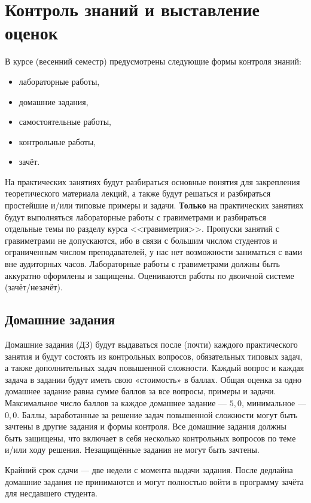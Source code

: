 \documentclass[11pt, a4paper]{article}
\theoremstyle{plain}
\theoremstyle{definition}
\theoremstyle{remark}
\begin{document}
\section{Контроль знаний и выставление оценок}
В курсе (весенний семестр) предусмотрены следующие формы контроля знаний: 
\begin{itemize}
    \item лабораторные работы,
    \item домашние задания,
    \item самостоятельные работы,
    \item контрольные работы,
    \item зачёт.
\end{itemize}

На практических занятиях будут разбираться основные понятия для закрепления теоретического материала
лекций, а также будут решаться и разбираться простейшие и/или типовые примеры и задачи.
\textbf{Только} на
практических занятиях будут выполняться лабораторные работы с гравиметрами и разбираться отдельные
темы по разделу курса <<гравиметрия>>. Пропуски занятий с гравиметрами не допускаются, ибо в связи с
большим числом студентов и ограниченным числом преподавателей, у нас нет возможности заниматься с
вами вне аудиторных часов. Лабораторные работы с гравиметрами должны быть аккуратно оформлены и
защищены. Оцениваются работы по двоичной системе (зачёт/незачёт).

\subsection{Домашние задания}
Домашние задания (ДЗ) будут выдаваться после (почти) каждого практического занятия и будут
состоять из контрольных вопросов, обязательных типовых задач, а также дополнительных задач
повышенной сложности. Каждый вопрос и каждая задача в задании будут иметь свою «стоимость» в баллах.
Общая оценка за одно домашнее задание равна сумме баллов за все вопросы, примеры и задачи.
Максимальное число баллов за каждое домашнее задание --- $5,0$, минимальное --- $0,0$. Баллы, заработанные за решение задач
повышенной сложности могут быть зачтены в другие задания и формы контроля. Все домашние задания
должны быть защищены, что включает в себя несколько контрольных вопросов по теме и/или ходу решения.
Незащищённые задания не могут быть зачтены. 

Крайний срок сдачи --- две недели с момента выдачи
задания. После дедлайна домашние задания не принимаются и могут полностью войти в программу зачёта
для несдавшего студента. 
\end{document}
